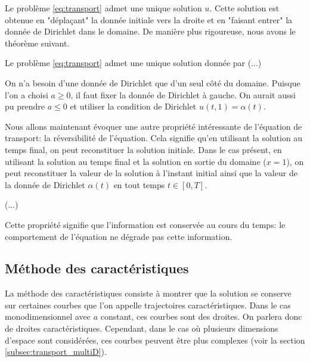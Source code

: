 \documentclass[12pt,a4paper,twoside]{article}
\begin{document}
Le probl\`eme \eqref{eq:transport} admet une unique solution $u$.
Cette solution est obtenue en "d\'epla\c{c}ant" la donn\'ee initiale
vers la droite et en "faisant entrer" la donn\'ee de Dirichlet dans le domaine.
De mani\`ere plus rigoureuse, nous avons le th\'eor\`eme suivant.

\begin{theorem}
  Le probl\`eme \eqref{eq:transport} admet une unique solution donn\'ee par
  (...)
\end{theorem}

\begin{remark}
  On n'a besoin d'une donn\'ee de Dirichlet que d'un seul c\^ot\'e du domaine.
  Puisque l'on a choisi $a \geq 0$, il faut fixer la donn\'ee de Dirichlet \`a gauche.
  On aurait aussi pu prendre $a \leq 0$ et utiliser la condition de Dirichlet
  $u(t,1) = \alpha(t)$.
\end{remark}


Nous allons maintenant \'evoquer une autre propri\'et\'e int\'eressante de l'\'equation
de transport: la r\'eversibilit\'e de l'\'equation.
Cela signifie qu'en utilisant la solution au temps final, on peut reconstituer la solution
initiale.
Dans le cas pr\'esent, en utilisant la solution au temps final et la solution en sortie 
du domaine ($x=1$), on peut reconstituer la valeur de la solution \`a l'instant initial
ainsi que la valeur de la donn\'ee de Dirichlet $\alpha(t)$ en tout temps $t \in [0,T]$.

\begin{proposition}
  (...)
\end{proposition}

Cette propri\'et\'e signifie que l'information est conserv\'ee au cours du temps:
le comportement de l'\'equation ne d\'egrade pas cette information.


\subsection{M\'ethode des caract\'eristiques}

La m\'ethode des caract\'eristiques consiste \`a montrer que la solution
se conserve sur certaines courbes que l'on appelle trajectoires caract\'eristiques.
Dans le cas monodimensionnel avec $a$ constant, ces courbes sont des droites.
On parlera donc de droites caract\'eristiques.
Cependant, dans le cas o\`u plusieurs dimensions d'espace sont consid\'er\'ees,
ces courbes peuvent \^etre plus complexes (voir la section \ref{subsec:transport_multiD}).
\end{document}
